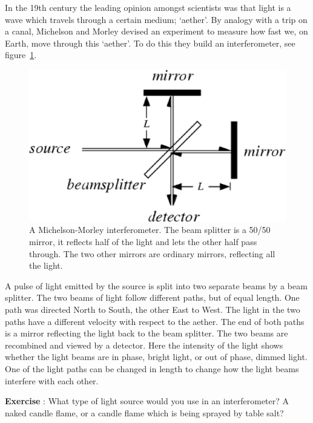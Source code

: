 \documentclass[12pt,a4paper]{article}
\numberwithin{equation}{section}
\numberwithin{figure}{section}
\newcounter{Exercise}
\numberwithin{table}{section}
\begin{document}
In the 19th century the leading opinion amongst scientists was that light is a wave which travels through a certain medium; `aether'. By analogy with a trip on a canal, Michelson and Morley devised an experiment to measure how fast we, on Earth, move through this `aether'. To do this they build an interferometer, see figure~\ref{fig:mm_int}.

\begin{figure}\begin{center}
\includegraphics[scale=0.6]{mm_int.eps}
\caption{A Michelson-Morley interferometer. The beam splitter is a 50/50 mirror, it reflects half of the light and lets the other half pass through. The two other mirrors are ordinary mirrors, reflecting all the light.}\label{fig:mm_int}
\end{center}\end{figure}

A pulse of light emitted by the source is split into two separate beams by a beam splitter. The two beams of light follow different paths, but of equal length. One path was directed North to South, the other East to West. The light in the two paths have a different velocity with respect to the aether. The end of both paths is a mirror reflecting the light back to the beam splitter. The two beams are recombined and viewed by a detector. Here the intensity of the light shows whether the light beams are in phase, bright light, or out of phase,  dimmed light. One of the light paths can be changed in length to change how the light beams interfere with each other.

\begin{shaded}
\textbf{Exercise \theExercise {}} : What type of light source would you use in an interferometer? A naked candle flame, or a candle flame which is being sprayed by table salt?\footnotemark \end{shaded}
\end{document}
